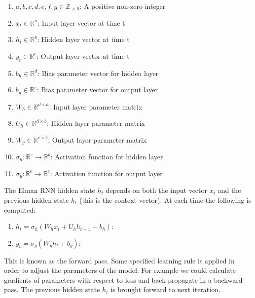 \documentclass[conference]{IEEEtran}
\begin{document}
\begin{enumerate}
	\item $a,b,c,d,e,f,g \in \mathbb{Z}_{>0}$: A positive non-zero integer
	
	\item $x_t \in \mathbb{R}^a$: Input layer vector at time t
	\item $h_t \in \mathbb{R}^b$: Hidden layer vector at time t
	\item $y_t \in \mathbb{R}^c$: Output layer vector at time t
	
	\item $b_h \in \mathbb{R}^{d}$: Bias parameter vector for hidden layer
	\item $b_y \in \mathbb{R}^{e}$: Bias parameter vector for output layer
	
	\item $W_h \in \mathbb{R}^{d \times a}$: Input layer parameter matrix
	\item $U_h \in \mathbb{R}^{d \times b}$: Hidden layer parameter matrix
	
	\item $W_y \in \mathbb{R}^{e \times b}$: Output layer parameter matrix
	
	
	\item $\sigma_h: \mathbb{R}^e \to \mathbb{R}^b $: Activation function for hidden layer
	\item $\sigma_y: \mathbb{R}^e \to \mathbb{R}^c $: Activation function for output layer
\end{enumerate}



The Elman RNN hidden state $h_t$ depends on both the input vector $x_t$ and the previous hidden state $h_t$ (this is the context vector). At each time the following is computed:

\begin{enumerate}
	\item $h_t = \sigma_h(W_h x_t + U_h h_{t-1} + b_h)$: 
	\item $y_t = \sigma_y(W_y h_t + b_y)$: 
\end{enumerate}

This is known as the forward pass. Some specified learning rule is applied in order to adjust the parameters of the model. For example we could calculate gradients of parameters with respect to loss and back-propagate in a backward pass. The previous hidden state $h_t$ is brought forward to next iteration.
\end{document}
